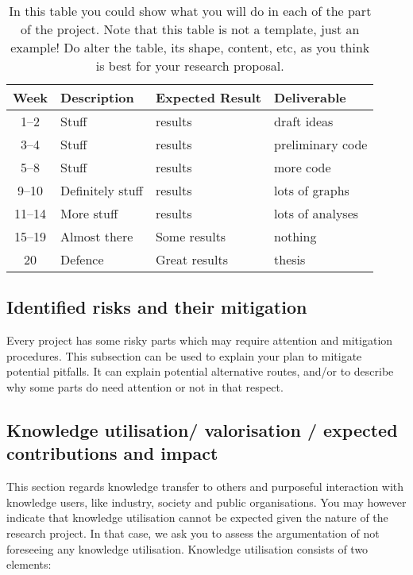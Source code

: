 \documentclass{article}
\begin{document}
\begin{table}[htp]
\caption{In this table you could show what you will do in each of the part of the project. Note that this table is not a template, just an example! Do alter the table, its shape, content, etc, as you think is best for your research proposal.}\label{tab1}
\begin{center}
\begin{tabular}{c|l|l|l}
Week & Description & Expected Result & Deliverable\\
\hline
1--2 & Stuff & results & draft ideas\\
3--4 & Stuff & results & preliminary code\\
5--8 & Stuff & results & more code\\
9--10 & Definitely stuff & results & lots of graphs\\
11--14 & More stuff & results & lots of analyses\\
15--19 & Almost there & Some results & nothing\\
20 & Defence & Great results &thesis\\
\hline
\end{tabular}
\end{center}
\end{table}

\subsection{Identified risks and their mitigation}

Every project has some risky parts which may require attention and mitigation procedures. This subsection can be used to explain your plan to mitigate potential pitfalls. It can explain potential alternative routes, and/or to describe why some parts do need attention or not in that respect.

\subsection{Knowledge utilisation/ valorisation / expected contributions and impact}

This section regards knowledge transfer to others and purposeful interaction with knowledge users, like industry, society and public organisations. You may however indicate that knowledge utilisation cannot be expected given the nature of the research project. In that case, we ask you to assess the argumentation of not foreseeing any knowledge utilisation. Knowledge utilisation consists of two elements: 
\end{document}
